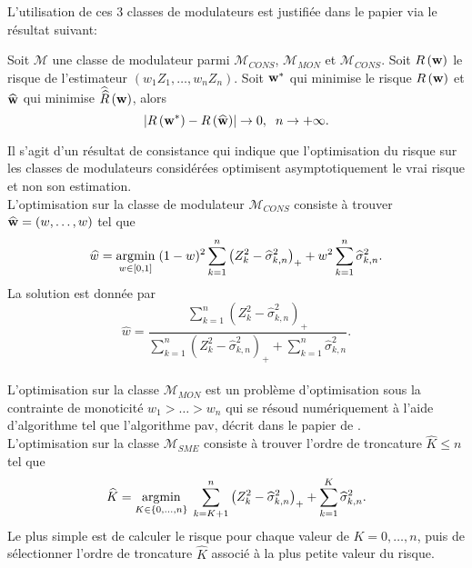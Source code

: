 L'utilisation de ces $3$ classes de modulateurs est justifiée dans le papier \citet{BeDu98} via le résultat suivant:
\begin{Theo}\label{BreanDumbgenTheo}
Soit $\mathcal{M}$ une classe de modulateur parmi $\mathcal{M}_{CONS}$, $\mathcal{M}_{MON}$ et $\mathcal{M}_{CONS}$. Soit $R\left(\bold{w}\right)$ le risque de l\rq{}estimateur $(w_{1}Z_{1},\ldots,w_{n}Z_{n})$. Soit $\bold{w}^{*}$ qui minimise le risque $R\left(\bold{w}\right)$ et $\widehat{\bold{w}}$ qui minimise $\widehat{\widehat{R}}\left(\bold{w}\right)$, alors 
\begin{equation*}
\left|R\left(\bold{w}^{*}\right)-R\left(\widehat{\bold{w}}\right)\right|\rightarrow 0,\hspace{0.2cm}n\rightarrow+\infty.
\end{equation*}
\end{Theo} 
Il s\rq{}agit d\rq{}un résultat de consistance qui indique que l\rq{}optimisation du risque sur les classes de modulateurs considérées optimisent asymptotiquement le vrai risque et non son estimation.\\

L\rq{}optimisation sur la classe de modulateur $\mathcal{M}_{CONS}$ consiste à trouver $\widehat{\bold{w}}=(w,\ldots,w)$ tel que 
\begin{equation*}
\widehat{w}=\underset{w\in[0,1]}{\operatorname{argmin}} \hspace{0.1cm}(1-w)^{2}\sum_{k=1}^{n}\left(Z_{k}^{2}-\widehat{\sigma}_{k,n}^{2}\right)_{+}+w^{2}\sum_{k=1}^{n}\widehat{\sigma}_{k,n}^{2}.
\end{equation*}
La solution est donnée par
\begin{equation}\label{OptimalConstantModulator}
\widehat{w}=\frac{\sum_{k=1}^{n}\left(Z_{k}^{2}-\widehat{\sigma}_{k,n}^{2}\right)_{+}}{\sum_{k=1}^{n}\left(Z_{k}^{2}-\widehat{\sigma}_{k,n}^{2}\right)_{+}+\sum_{k=1}^{n}\widehat{\sigma}_{k,n}^{2}}.
\end{equation}
\\
L\rq{}optimisation sur la classe $\mathcal{M}_{MON}$ est un problème d\rq{}optimisation sous la contrainte de monoticité $w_{1}>\ldots>w_{n}$ qui se résoud numériquement à l\rq{}aide d\rq{}algorithme tel que l\rq{}algorithme \gls{pav}, décrit dans le papier de \citet{RoWrDy88}.\\

L\rq{}optimisation sur la classe $\mathcal{M}_{SME}$ consiste à trouver l\rq{}ordre de troncature $\widehat{K}\leq n$ tel que 
\begin{equation}
\widehat{K}=\underset{K\in\{0,\ldots,n\}}{\operatorname{argmin}} \hspace{0.1cm} \sum_{k=K+1}^{n}\left(Z_{k}^{2}-\widehat{\sigma}_{k,n}^{2}\right)_{+}+\sum_{k=1}^{K}\widehat{\sigma}_{k,n}^{2}.
\end{equation}
Le plus simple est de calculer le risque pour chaque valeur de $K=0,\ldots,n$, puis de sélectionner l\rq{}ordre de troncature $\widehat{K}$ associé à la plus petite valeur du risque.\\


